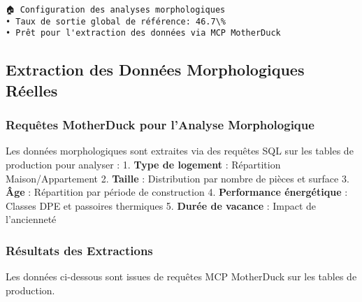 \documentclass[11pt]{article}
\begin{document}
    \begin{Verbatim}[commandchars=\\\{\}]
🏠 Configuration des analyses morphologiques
• Taux de sortie global de référence: 46.7\%
• Prêt pour l'extraction des données via MCP MotherDuck
    \end{Verbatim}

    \subsection{Extraction des Données Morphologiques
Réelles}\label{extraction-des-donnuxe9es-morphologiques-ruxe9elles}

\subsubsection{Requêtes MotherDuck pour l'Analyse
Morphologique}\label{requuxeates-motherduck-pour-lanalyse-morphologique}

Les données morphologiques sont extraites via des requêtes SQL sur les
tables de production pour analyser : 1. \textbf{Type de logement} :
Répartition Maison/Appartement 2. \textbf{Taille} : Distribution par
nombre de pièces et surface 3. \textbf{Âge} : Répartition par période de
construction 4. \textbf{Performance énergétique} : Classes DPE et
passoires thermiques 5. \textbf{Durée de vacance} : Impact de
l'ancienneté

\subsubsection{Résultats des
Extractions}\label{ruxe9sultats-des-extractions}

Les données ci-dessous sont issues de requêtes MCP MotherDuck sur les
tables de production.
\end{document}
